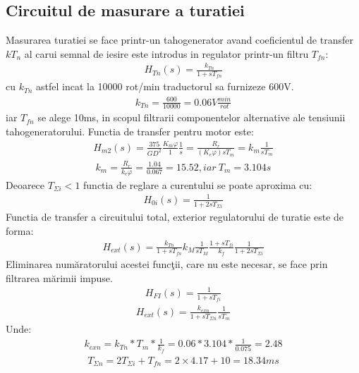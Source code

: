 \documentclass[11pt]{article}
\begin{document}
\subsection{Circuitul de masurare a turatiei}
Masurarea turatiei se face printr-un tahogenerator avand coeficientul de transfer $kT_n$ al carui semnal de iesire este introdus in regulator printr-un filtru $T_{fn}$:
\begin{align*}
H_{Tn}(s)=\frac{k_{Tn}}{1+sT_{fn}}
\end{align*}
cu $k_{Tn}$ astfel incat la 10000 rot/min traductorul sa furnizeze 600V.
\begin{align*}
k_{Tn}=\frac{600}{10000}=0.06V\frac{min}{rot}
\end{align*}
iar $T_{fn}$ se alege 10ms, in scopul filtrarii componentelor alternative ale tensiunii tahogeneratorului.
Functia de transfer pentru motor este:
\begin{align*}
H_{m2}(s)=\frac{375}{GD^2}\frac{K_m\varphi}{1}\frac{1}{s}=\frac{R_r}{(K_e\varphi)sT_m}=k_m\frac{1}{sT_m}
\end{align*}
\begin{align*}
k_m=\frac{R_r}{k_e\varphi}=\frac{1.04}{0.067}=15.52, iar\ T_m=3.104s
\end{align*}
Deoarece $T_{\Sigma i}<1$ functia de reglare a curentului se poate aproxima cu:
\begin{align*}
H_{0i}(s)=\frac{1}{1+2sT_{\Sigma i}}
\end{align*}
Functia de transfer a circuitului total, exterior regulatorului de turatie este de forma:
\begin{align*}
H_{ext}(s)=\frac{k_{Tn}}{1+sT_{fn}}k_M\frac{1}{sT_M}\frac{1+sT_{fi}}{k_f}\frac{1}{1+2sT_{\Sigma i}}
\end{align*}
Eliminarea număratorului acestei funcţii, care nu este necesar, se face prin filtrarea mărimii impuse.
\begin{align*}
H_{FI}(s)=\frac{1}{1+sT_{fi}}
\end{align*}
\begin{align*}
H_{ext}(s)=\frac{k_{exn}}{1+sT_{\Sigma n}}\frac{1}{sT_m}
\end{align*}
Unde:
\begin{align*}
k_{exn}=k_{Tn}\ast T_m\ast \frac{1}{k_f}=0.06\ast 3.104 \ast \frac{1}{0.075}=2.48
\end{align*}
\begin{align*}
T_{\Sigma n}=2T_{\Sigma i}+T_{fn}=2\times 4.17 + 10=18.34ms
\end{align*}
\end{document}
